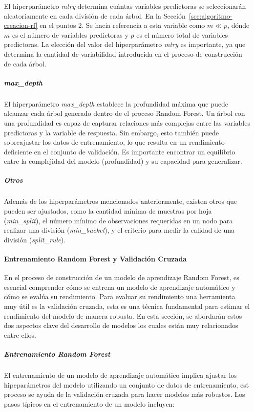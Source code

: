 El hiperparámetro \textit{mtry} determina cuántas variables predictoras se seleccionarán aleatoriamente en cada división de cada árbol. En la Sección~\ref{sec:algoritmo-creacion-rf} en el puntos $2$. Se hacia referencia a esta variable como  \(m \ll p\), dónde \(m\) es el número de variables predictoras y \(p\) es el número total de variables predictoras. La elección del valor del hiperparámetro  \textit{mtry} es importante, ya que determina la cantidad de variabilidad introducida en el proceso de construcción de cada árbol. 

\subparagraph{\textit{max\_depth}}
El hiperparámetro \textit{max\_depth} establece la profundidad máxima que puede alcanzar cada árbol generado dentro de el proceso Random Forest. Un árbol con una profundidad es capaz de capturar relaciones más complejas entre las variables predictoras y la variable de respuesta. Sin embargo, esto también puede sobreajustar los datos de entrenamiento, lo que resulta en un rendimiento deficiente en el conjunto de validación. Es importante encontrar un equilibrio entre la complejidad del modelo (profundidad) y su capacidad para generalizar.

\subparagraph{Otros}
Además de los hiperparámetros mencionados anteriormente, existen otros que pueden ser ajustados, como la cantidad mínima de muestras por hoja (\textit{min\_split}), el número mínimo de observaciones requeridas en un nodo para realizar una división (\textit{min\_bucket}), y el criterio para medir la calidad de una división (\textit{split\_rule}).

\paragraph{Entrenamiento Random Forest y Validación Cruzada}\label{sec:entrenamiento-rf-validacion-cruzada}

En el proceso de construcción de un modelo de aprendizaje Random Forest, es esencial comprender cómo se entrena un modelo de aprendizaje automático y cómo se evalúa su rendimiento. Para evaluar su rendimiento una herramienta muy útil es la validación cruzada, esta es una técnica fundamental para estimar el rendimiento del modelo de manera robusta. En esta sección, se abordarán estos dos aspectos clave del desarrollo de modelos los cuales están muy relacionados entre ellos.

\subparagraph{Entrenamiento Random Forest}

El entrenamiento de un modelo de aprendizaje automático implica ajustar los hipeparámetros del modelo utilizando un conjunto de datos de entrenamiento, est proceso se ayuda de la validación cruzada para hacer modelos más robustos. Los pasos típicos en el entrenamiento de un modelo incluyen:

